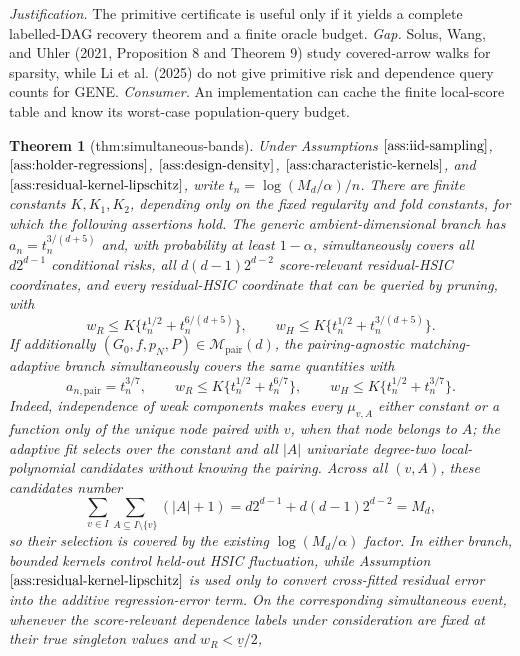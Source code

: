 \documentclass{article}
\newtheorem{theorem}{Theorem}
\begin{document}
\par\smallskip\noindent \textit{Justification.} The primitive certificate is useful only if it yields a complete labelled-DAG recovery theorem and a finite oracle budget. \textit{Gap.} Solus, Wang, and Uhler (2021, Proposition 8 and Theorem 9) study covered-arrow walks for sparsity, while Li et al. (2025) do not give primitive risk and dependence query counts for GENE. \textit{Consumer.} An implementation can cache the finite local-score table and know its worst-case population-query budget.

\begin{theorem}[thm:simultaneous-bands]\label{thm:simultaneous-bands}
Under Assumptions \(\ref{ass:iid-sampling}\), \(\ref{ass:holder-regressions}\), \(\ref{ass:design-density}\), \(\ref{ass:characteristic-kernels}\), and \(\ref{ass:residual-kernel-lipschitz}\), write \(t_n=\log(M_d/\alpha)/n\). There are finite constants \(K,K_1,K_2\), depending only on the fixed regularity and fold constants, for which the following assertions hold. The generic ambient-dimensional branch has \(a_n=t_n^{3/(d+5)}\) and, with probability at least \(1-\alpha\), simultaneously covers all \(d2^{d-1}\) conditional risks, all \(d(d-1)2^{d-2}\) score-relevant residual-HSIC coordinates, and every residual-HSIC coordinate that can be queried by pruning, with
\[
 w_R\le K\{t_n^{1/2}+t_n^{6/(d+5)}\},
 \qquad
 w_H\le K\{t_n^{1/2}+t_n^{3/(d+5)}\}.
\]
If additionally \((G_0,f,p_N,P)\in\mathcal M_{\mathrm{pair}}(d)\), the pairing-agnostic matching-adaptive branch simultaneously covers the same quantities with
\[
 a_{n,\mathrm{pair}}=t_n^{3/7},
 \qquad
 w_R\le K\{t_n^{1/2}+t_n^{6/7}\},
 \qquad
 w_H\le K\{t_n^{1/2}+t_n^{3/7}\}.
\]
Indeed, independence of weak components makes every \(\mu_{v,A}\) either constant or a function only of the unique node paired with \(v\), when that node belongs to \(A\); the adaptive fit selects over the constant and all \(|A|\) univariate degree-two local-polynomial candidates without knowing the pairing. Across all \((v,A)\), these candidates number
\[
 \sum_{v\in I}\sum_{A\subseteq I\setminus\{v\}}(|A|+1)
 =d2^{d-1}+d(d-1)2^{d-2}=M_d,
\]
so their selection is covered by the existing \(\log(M_d/\alpha)\) factor. In either branch, bounded kernels control held-out HSIC fluctuation, while Assumption \(\ref{ass:residual-kernel-lipschitz}\) is used only to convert cross-fitted residual error into the additive regression-error term. On the corresponding simultaneous event, whenever the score-relevant dependence labels under consideration are fixed at their true singleton values and \(w_R<\underline v/2\),

\end{theorem}
\end{document}

